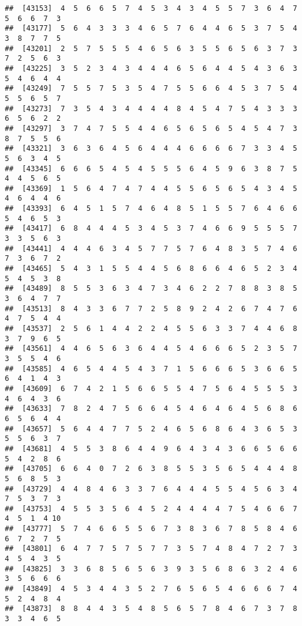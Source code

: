 \documentclass[
]{book}
\begin{document}
\begin{verbatim}
##  [43153]  4  5  6  6  5  7  4  5  3  4  3  4  5  5  7  3  6  4  7  5  6  6  7  3
##  [43177]  5  6  4  3  3  3  4  6  5  7  6  4  4  6  5  3  7  5  4  3  8  7  7  5
##  [43201]  2  5  7  5  5  5  4  6  5  6  3  5  5  6  5  6  3  7  3  7  2  5  6  3
##  [43225]  3  5  2  3  4  3  4  4  4  6  5  6  4  4  5  4  3  6  3  5  4  6  4  4
##  [43249]  7  5  5  7  5  3  5  4  7  5  5  6  6  4  5  3  7  5  4  5  5  6  5  7
##  [43273]  7  3  5  4  3  4  4  4  4  8  4  5  4  7  5  4  3  3  3  6  5  6  2  2
##  [43297]  3  7  4  7  5  5  4  4  6  5  6  5  6  5  4  5  4  7  3  8  7  5  5  6
##  [43321]  3  6  3  6  4  5  6  4  4  4  6  6  6  6  7  3  3  4  5  5  6  3  4  5
##  [43345]  6  6  6  5  4  5  4  5  5  5  6  4  5  9  6  3  8  7  5  4  4  5  6  5
##  [43369]  1  5  6  4  7  4  7  4  4  5  5  6  5  6  5  4  3  4  5  4  6  4  4  6
##  [43393]  6  4  5  1  5  7  4  6  4  8  5  1  5  5  7  6  4  6  6  5  4  6  5  3
##  [43417]  6  8  4  4  4  5  3  4  5  3  7  4  6  6  9  5  5  5  7  3  3  5  6  3
##  [43441]  4  4  4  6  3  4  5  7  7  5  7  6  4  8  3  5  7  4  6  7  3  6  7  2
##  [43465]  5  4  3  1  5  5  4  4  5  6  8  6  6  4  6  5  2  3  4  5  4  5  3  8
##  [43489]  8  5  5  3  6  3  4  7  3  4  6  2  2  7  8  8  3  8  5  3  6  4  7  7
##  [43513]  8  4  3  3  6  7  7  2  5  8  9  2  4  2  6  7  4  7  6  4  7  5  4  4
##  [43537]  2  5  6  1  4  4  2  2  4  5  5  6  3  3  7  4  4  6  8  3  7  9  6  5
##  [43561]  4  4  6  5  6  3  6  4  4  5  4  6  6  6  5  2  3  5  7  3  5  5  4  6
##  [43585]  4  6  5  4  4  5  4  3  7  1  5  6  6  6  5  3  6  6  5  6  4  1  4  3
##  [43609]  6  7  4  2  1  5  6  6  5  5  4  7  5  6  4  5  5  5  3  4  6  4  3  6
##  [43633]  7  8  2  4  7  5  6  6  4  5  4  6  4  6  4  5  6  8  6  6  5  6  4  4
##  [43657]  5  6  4  4  7  7  5  2  4  6  5  6  8  6  4  3  6  5  3  5  5  6  3  7
##  [43681]  4  5  5  3  8  6  4  4  9  6  4  3  4  3  6  6  5  6  6  5  4  2  8  6
##  [43705]  6  6  4  0  7  2  6  3  8  5  5  3  5  6  5  4  4  4  8  5  6  8  5  3
##  [43729]  4  4  8  4  6  3  3  7  6  4  4  4  5  5  4  5  6  3  4  7  5  3  7  3
##  [43753]  4  5  5  3  5  6  4  5  2  4  4  4  4  7  5  4  6  6  7  4  5  1  4 10
##  [43777]  5  7  4  6  6  5  5  6  7  3  8  3  6  7  8  5  8  4  6  6  7  2  7  5
##  [43801]  6  4  7  7  5  7  5  7  7  3  5  7  4  8  4  7  2  7  3  4  5  4  3  5
##  [43825]  3  3  6  8  5  6  5  6  3  9  3  5  6  8  6  3  2  4  6  3  5  6  6  6
##  [43849]  4  5  3  4  4  3  5  2  7  6  5  6  5  4  6  6  6  7  4  5  2  4  8  4
##  [43873]  8  8  4  4  3  5  4  8  5  6  5  7  8  4  6  7  3  7  8  3  3  4  6  5

\end{verbatim}
\end{document}
